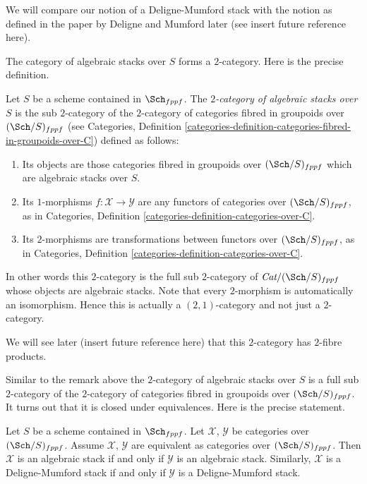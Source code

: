 \noindent
We will compare our notion of a Deligne-Mumford stack with
the notion as defined in the paper by Deligne and Mumford later
(see insert future reference here).

\medskip\noindent
The category of algebraic stacks over $S$ forms a $2$-category.
Here is the precise definition.

\begin{definition}
\label{definition-morphism-algebraic-stacks}
Let $S$ be a scheme contained in $\Sch_{fppf}$.
The {\it $2$-category of algebraic stacks over $S$} is the
sub $2$-category of the $2$-category of categories fibred in
groupoids over $(\Sch/S)_{fppf}$ (see
Categories,
Definition \ref{categories-definition-categories-fibred-in-groupoids-over-C})
defined as follows:
\begin{enumerate}
\item Its objects are those categories fibred in groupoids
over $(\Sch/S)_{fppf}$ which are algebraic stacks over $S$.
\item Its $1$-morphisms $f : \mathcal{X} \to \mathcal{Y}$ are
any functors of categories over $(\Sch/S)_{fppf}$, as in
Categories, Definition \ref{categories-definition-categories-over-C}.
\item Its $2$-morphisms are transformations between functors
over $(\Sch/S)_{fppf}$, as in
Categories, Definition \ref{categories-definition-categories-over-C}.
\end{enumerate}
\end{definition}

\noindent
In other words this $2$-category is the full sub $2$-category of
$\textit{Cat}/(\Sch/S)_{fppf}$ whose objects are algebraic stacks.
Note that every $2$-morphism is automatically an isomorphism.
Hence this is actually a $(2, 1)$-category and not just a $2$-category.

\medskip\noindent
We will see later (insert future reference here) that this $2$-category
has $2$-fibre products.

\medskip\noindent
Similar to the remark above the $2$-category of algebraic stacks over $S$ is a
full sub $2$-category of the $2$-category of categories fibred in groupoids
over $(\Sch/S)_{fppf}$. It turns out that it is closed under
equivalences. Here is the precise statement.

\begin{lemma}
\label{lemma-equivalent}
Let $S$ be a scheme contained in $\Sch_{fppf}$.
Let $\mathcal{X}$, $\mathcal{Y}$ be categories over $(\Sch/S)_{fppf}$.
Assume $\mathcal{X}$, $\mathcal{Y}$ are equivalent as categories over
$(\Sch/S)_{fppf}$. Then $\mathcal{X}$ is an algebraic stack if and
only if $\mathcal{Y}$ is an algebraic stack. Similarly, $\mathcal{X}$
is a Deligne-Mumford stack if and only if $\mathcal{Y}$ is a Deligne-Mumford
stack.
\end{lemma}

